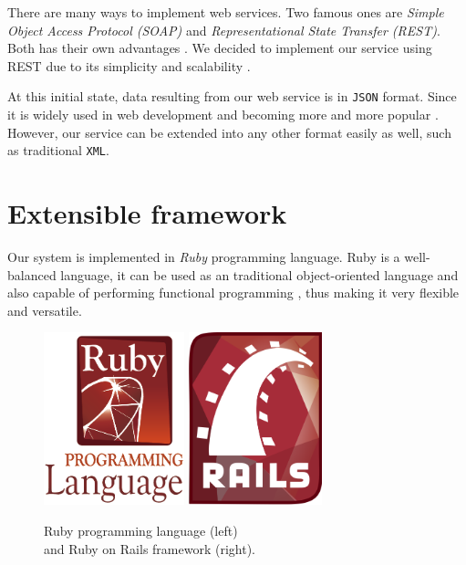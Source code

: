 There are many ways to implement web services. Two famous ones are
\emph{Simple Object Access Protocol (SOAP)} and
\emph{Representational State Transfer (REST)}.
Both has their own advantages \cite{ws2}. We decided to implement
our service using REST due to its simplicity and scalability \cite{ws3}\cite{ws4}.

At this initial state, data resulting from our web service
is in \texttt{JSON} \cite{json} format. Since it is widely used in web development
and becoming more and more popular \cite{rest}. However, our service can be extended
into any other format easily as well, such as traditional \texttt{XML}.

\section{Extensible framework}


Our system is implemented in \emph{Ruby} \cite{ruby} programming language.
Ruby is a well-balanced language, it can be used as an traditional
object-oriented language \cite{rubyoo} and also capable of performing
functional programming \cite[]{rubyfp}, thus making it very flexible and versatile.

\begin{figure}
\centering
\captionsetup{justification=centering}
\includegraphics[height=5cm]{gfx/ruby}
\hspace{0.5cm}
\includegraphics[height=5cm]{gfx/ror}
\caption[Ruby and Ruby on Rails]{Ruby programming language (left) \\
and Ruby on Rails framework (right).}
\end{figure}

